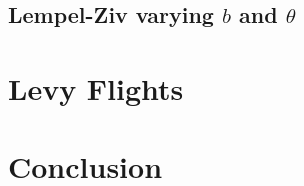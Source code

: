 \documentclass[notitlepage, a4paper]{article}
\theoremstyle{definition}
\begin{document}
\subsection{Lempel-Ziv varying $b$ and $\theta$}


\newpage

\section{Levy Flights}

\newpage

\section{Conclusion}


\newpage



\end{document}
